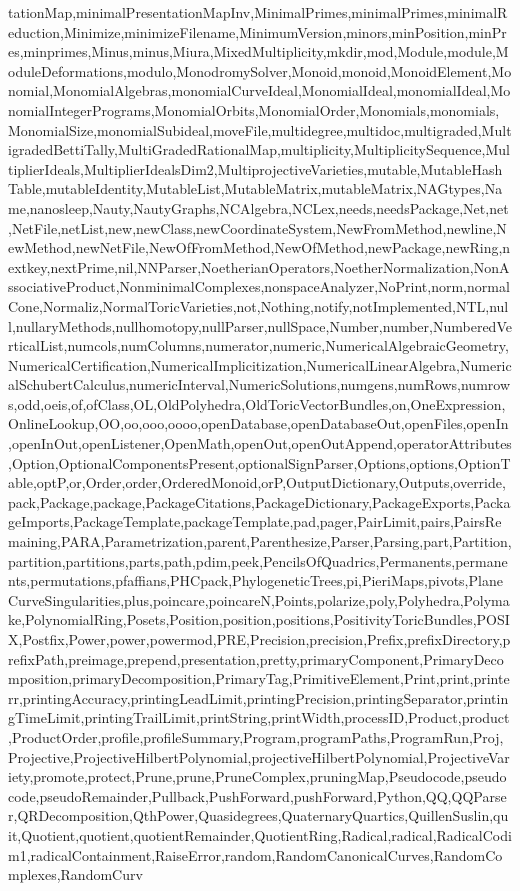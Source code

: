 {tationMap,minimalPresentationMapInv,MinimalPrimes,minimalPrimes,minimalReduction,Minimize,minimizeFilename,MinimumVersion,minors,minPosition,minPres,minprimes,Minus,minus,Miura,MixedMultiplicity,mkdir,mod,Module,module,ModuleDeformations,modulo,MonodromySolver,Monoid,monoid,MonoidElement,Monomial,MonomialAlgebras,monomialCurveIdeal,MonomialIdeal,monomialIdeal,MonomialIntegerPrograms,MonomialOrbits,MonomialOrder,Monomials,monomials,MonomialSize,monomialSubideal,moveFile,multidegree,multidoc,multigraded,MultigradedBettiTally,MultiGradedRationalMap,multiplicity,MultiplicitySequence,MultiplierIdeals,MultiplierIdealsDim2,MultiprojectiveVarieties,mutable,MutableHashTable,mutableIdentity,MutableList,MutableMatrix,mutableMatrix,NAGtypes,Name,nanosleep,Nauty,NautyGraphs,NCAlgebra,NCLex,needs,needsPackage,Net,net,NetFile,netList,new,newClass,newCoordinateSystem,NewFromMethod,newline,NewMethod,newNetFile,NewOfFromMethod,NewOfMethod,newPackage,newRing,nextkey,nextPrime,nil,NNParser,NoetherianOperators,NoetherNormalization,NonAssociativeProduct,NonminimalComplexes,nonspaceAnalyzer,NoPrint,norm,normalCone,Normaliz,NormalToricVarieties,not,Nothing,notify,notImplemented,NTL,null,nullaryMethods,nullhomotopy,nullParser,nullSpace,Number,number,NumberedVerticalList,numcols,numColumns,numerator,numeric,NumericalAlgebraicGeometry,NumericalCertification,NumericalImplicitization,NumericalLinearAlgebra,NumericalSchubertCalculus,numericInterval,NumericSolutions,numgens,numRows,numrows,odd,oeis,of,ofClass,OL,OldPolyhedra,OldToricVectorBundles,on,OneExpression,OnlineLookup,OO,oo,ooo,oooo,openDatabase,openDatabaseOut,openFiles,openIn,openInOut,openListener,OpenMath,openOut,openOutAppend,operatorAttributes,Option,OptionalComponentsPresent,optionalSignParser,Options,options,OptionTable,optP,or,Order,order,OrderedMonoid,orP,OutputDictionary,Outputs,override,pack,Package,package,PackageCitations,PackageDictionary,PackageExports,PackageImports,PackageTemplate,packageTemplate,pad,pager,PairLimit,pairs,PairsRemaining,PARA,Parametrization,parent,Parenthesize,Parser,Parsing,part,Partition,partition,partitions,parts,path,pdim,peek,PencilsOfQuadrics,Permanents,permanents,permutations,pfaffians,PHCpack,PhylogeneticTrees,pi,PieriMaps,pivots,PlaneCurveSingularities,plus,poincare,poincareN,Points,polarize,poly,Polyhedra,Polymake,PolynomialRing,Posets,Position,position,positions,PositivityToricBundles,POSIX,Postfix,Power,power,powermod,PRE,Precision,precision,Prefix,prefixDirectory,prefixPath,preimage,prepend,presentation,pretty,primaryComponent,PrimaryDecomposition,primaryDecomposition,PrimaryTag,PrimitiveElement,Print,print,printerr,printingAccuracy,printingLeadLimit,printingPrecision,printingSeparator,printingTimeLimit,printingTrailLimit,printString,printWidth,processID,Product,product,ProductOrder,profile,profileSummary,Program,programPaths,ProgramRun,Proj,Projective,ProjectiveHilbertPolynomial,projectiveHilbertPolynomial,ProjectiveVariety,promote,protect,Prune,prune,PruneComplex,pruningMap,Pseudocode,pseudocode,pseudoRemainder,Pullback,PushForward,pushForward,Python,QQ,QQParser,QRDecomposition,QthPower,Quasidegrees,QuaternaryQuartics,QuillenSuslin,quit,Quotient,quotient,quotientRemainder,QuotientRing,Radical,radical,RadicalCodim1,radicalContainment,RaiseError,random,RandomCanonicalCurves,RandomComplexes,RandomCurv}
